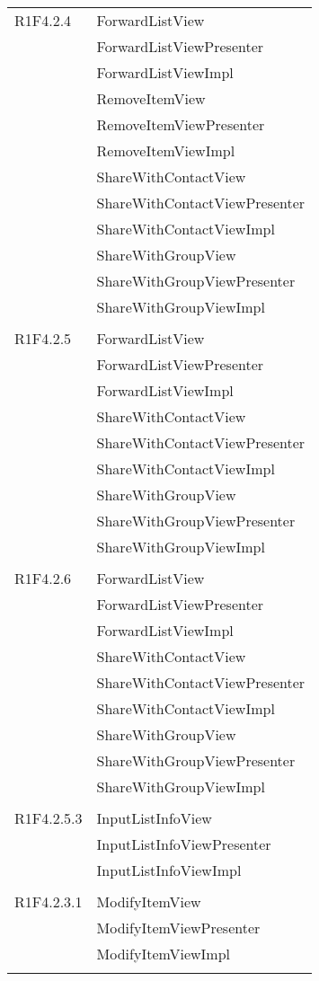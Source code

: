 \begin{center}
\begin{longtable}{|p{7cm}|p{5cm}|}
		R1F4.2.4 & ForwardListView \\ & ForwardListViewPresenter \\ & ForwardListViewImpl \\ & RemoveItemView \\ & RemoveItemViewPresenter \\ & RemoveItemViewImpl \\ & ShareWithContactView \\ & ShareWithContactViewPresenter \\ & ShareWithContactViewImpl \\ & ShareWithGroupView \\ & ShareWithGroupViewPresenter \\ & ShareWithGroupViewImpl \\ & \\ \hline
		R1F4.2.5 & ForwardListView \\ & ForwardListViewPresenter \\ & ForwardListViewImpl \\ & ShareWithContactView \\ & ShareWithContactViewPresenter \\ & ShareWithContactViewImpl \\ & ShareWithGroupView \\ & ShareWithGroupViewPresenter \\ & ShareWithGroupViewImpl \\ & \\ \hline
		R1F4.2.6 & ForwardListView \\ & ForwardListViewPresenter \\ & ForwardListViewImpl \\ & ShareWithContactView \\ & ShareWithContactViewPresenter \\ & ShareWithContactViewImpl \\ & ShareWithGroupView \\ & ShareWithGroupViewPresenter \\ & ShareWithGroupViewImpl \\ & \\ \hline
		R1F4.2.5.3 & InputListInfoView \\ & InputListInfoViewPresenter \\ & InputListInfoViewImpl \\ & \\ \hline
		R1F4.2.3.1 & ModifyItemView \\ & ModifyItemViewPresenter \\ & ModifyItemViewImpl \\ & \\ \hline

\end{longtable}
\end{center}
